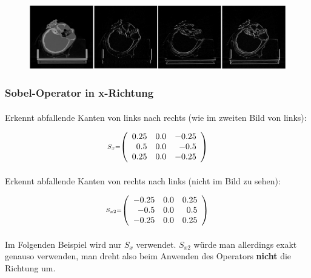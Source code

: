 \documentclass[11pt]{article}
\makeatletter
\def\maxwidth{\ifdim\Gin@nat@width>\linewidth\linewidth
    \else\Gin@nat@width\fi}
\let\Oldincludegraphics\includegraphics
\renewcommand{\includegraphics}[1]{\Oldincludegraphics[width=.8\maxwidth]{#1}}
\makeatother
\begin{document}
\begin{figure}[hbt]
    \centering
    \includegraphics{beispiel_schaedel.png}
\end{figure}


    \hypertarget{sobel-operator-in-x-richtung}{%
\subsubsection*{Sobel-Operator in
x-Richtung}\label{sobel-operator-in-x-richtung}}

    \paragraph{}
    Erkennt abfallende Kanten von links nach rechts (wie im zweiten Bild von links):

    \[\scriptstyle S_x =  \def\g{\color{lightgray}}\left(\begin{array}{rrr}0.25 & 0.0 & -0.25\\0.5 & 0.0 & -0.5\\0.25 & 0.0 & -0.25\end{array}\right)\]
    
    \paragraph{}
    Erkennt abfallende Kanten von rechts nach links (nicht im Bild zu sehen):
    
    \[\scriptstyle S_{x2} =  \def\g{\color{lightgray}}\left(\begin{array}{rrr}-0.25 & 0.0 & 0.25\\-0.5 & 0.0 & 0.5\\-0.25 & 0.0 & 0.25\end{array}\right)\]

    \paragraph{}
    Im Folgenden Beispiel wird nur $S_x$ verwendet. $S_{x2}$ würde man allerdings exakt genauso verwenden, man dreht also beim Anwenden des Operators \textbf{nicht} die Richtung um.
    
\end{document}
